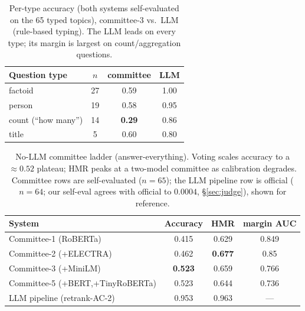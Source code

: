 \documentclass[sigconf,nonacm]{acmart}
\newcommand{\HMR}{\textsc{HMR}}
\begin{document}
\begin{table}[t]
\centering\small
\caption{Per-type accuracy (both systems self-evaluated on the 65 typed topics),
committee-3 vs.\ LLM (rule-based typing). The LLM leads on every type; its margin is largest
on count/aggregation questions.}
\label{tab:pertype}
\begin{tabular}{lccc}
\toprule
Question type & $n$ & committee & LLM \\
\midrule
factoid & 27 & 0.59 & 1.00 \\
person  & 19 & 0.58 & 0.95 \\
count (``how many'') & 14 & \textbf{0.29} & 0.86 \\
title   & 5  & 0.60 & 0.80 \\
\bottomrule
\end{tabular}
\end{table}

\begin{table}[t]
\centering\small
\caption{No-LLM committee ladder (answer-everything). Voting scales accuracy to a
$\approx0.52$ plateau; \HMR{} peaks at a two-model committee as calibration degrades.
Committee rows are self-evaluated ($n{=}65$); the LLM pipeline row is official ($n{=}64$;
our self-eval agrees with official to $0.0004$, \S\ref{sec:judge}), shown for reference.}
\label{tab:nollm}
\begin{tabular}{lccc}
\toprule
System & Accuracy & \HMR & margin AUC \\
\midrule
Committee-1 (RoBERTa) & 0.415 & 0.629 & 0.849 \\
Committee-2 (+ELECTRA) & 0.462 & \textbf{0.677} & 0.85 \\
Committee-3 (+MiniLM) & \textbf{0.523} & 0.659 & 0.766 \\
Committee-5 (+BERT,+TinyRoBERTa) & 0.523 & 0.644 & 0.736 \\
\midrule
LLM pipeline (retrank-AC-2) & 0.953 & 0.963 & --- \\
\bottomrule
\end{tabular}
\end{table}
\end{document}
